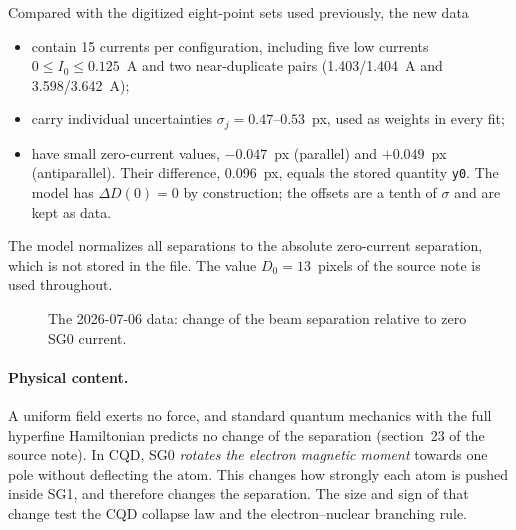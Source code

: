 \documentclass[11pt,a4paper]{article}
\newcommand{\pp}{{\uparrow\uparrow}}
\newcommand{\pa}{{\uparrow\downarrow}}
\begin{document}
Compared with the digitized eight-point sets used previously, the new data
\begin{itemize}
\item contain 15 currents per configuration, including five low currents $0\le I_0\le0.125$~A and two
near-duplicate pairs (1.403/1.404~A and 3.598/3.642~A);
\item carry individual uncertainties $\sigma_j=0.47$--$0.53$~px, used as weights in every fit;
\item have small zero-current values, $-0.047$~px (parallel) and $+0.049$~px (antiparallel). Their
difference, 0.096~px, equals the stored quantity \texttt{y0}. The model has $\Delta D(0)=0$ by
construction; the offsets are a tenth of $\sigma$ and are kept as data.
\end{itemize}
The model normalizes all separations to the absolute zero-current separation, which is not stored in
the file. The value $D_0=13$~pixels of the source note is used throughout.

\begin{figure}[h]
\centering
{}
\caption{The 2026-07-06 data: change of the beam separation relative to zero SG0 current.}
\label{fig:data}
\end{figure}

\paragraph{Physical content.} A uniform field exerts no force, and standard quantum mechanics with the
full hyperfine Hamiltonian predicts no change of the separation (section~23 of the source note). In
CQD, SG0 \emph{rotates the electron magnetic moment} towards one pole without deflecting the atom.
This changes how strongly each atom is pushed inside SG1, and therefore changes the separation. The
size and sign of that change test the CQD collapse law and the electron--nuclear branching rule.
\end{document}
